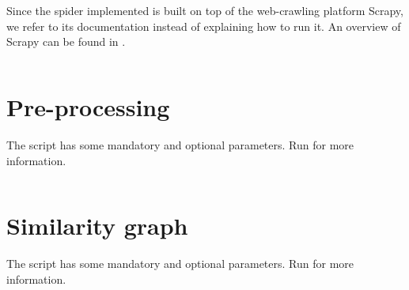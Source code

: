 Since the spider implemented is built on top of the web-crawling platform Scrapy, we refer to its documentation instead of explaining how to run it.
An overview of Scrapy can be found in \cite{kouzis2016learning}.

\inputminted{Python}{../code/random_spider.py}

\pagebreak
\section{Pre-processing} \label{preprocessing-code}
The script has some mandatory and optional parameters.
Run  for more information.

\inputminted{Python}{../code/preprocessing.py}

\pagebreak
\section{Similarity graph} \label{simgra}
The script has some mandatory and optional parameters.
Run  for more information.

\inputminted{Python}{../code/similarity_graph.py}